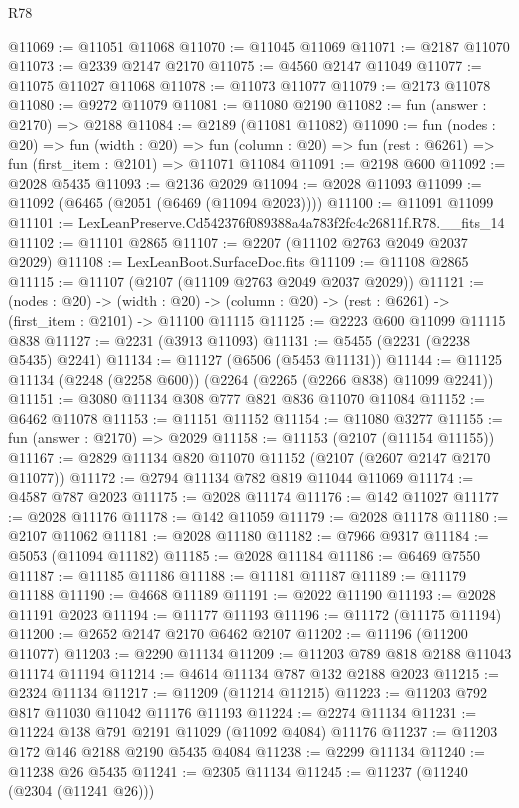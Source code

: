 \begin{lexlean}{R78}
\begin{coremodule}
@11069 := @11051 @11068
@11070 := @11045 @11069
@11071 := @2187 @11070
@11073 := @2339 @2147 @2170
@11075 := @4560 @2147 @11049
@11077 := @11075 @11027 @11068
@11078 := @11073 @11077
@11079 := @2173 @11078
@11080 := @9272 @11079
@11081 := @11080 @2190
@11082 := fun (answer : @2170) => @2188
@11084 := @2189 (@11081 @11082)
@11090 := fun (nodes : @20) =>
  fun (width : @20) =>
  fun (column : @20) => fun (rest : @6261) => fun (first_item : @2101) => @11071 @11084
@11091 := @2198 @600
@11092 := @2028 @5435
@11093 := @2136 @2029
@11094 := @2028 @11093
@11099 := @11092 (@6465 (@2051 (@6469 (@11094 @2023))))
@11100 := @11091 @11099
@11101 := LexLeanPreserve.Cd542376f089388a4a783f2fc4c26811f.R78.__fits_14
@11102 := @11101 @2865
@11107 := @2207 (@11102 @2763 @2049 @2037 @2029)
@11108 := LexLeanBoot.SurfaceDoc.fits
@11109 := @11108 @2865
@11115 := @11107 (@2107 (@11109 @2763 @2049 @2037 @2029))
@11121 := (nodes : @20) ->
  (width : @20) -> (column : @20) -> (rest : @6261) -> (first_item : @2101) -> @11100 @11115
@11125 := @2223 @600 @11099 @11115 @838
@11127 := @2231 (@3913 @11093)
@11131 := @5455 (@2231 (@2238 @5435) @2241)
@11134 := @11127 (@6506 (@5453 @11131))
@11144 := @11125 @11134 (@2248 (@2258 @600)) (@2264 (@2265 (@2266 @838) @11099 @2241))
@11151 := @3080 @11134 @308 @777 @821 @836 @11070 @11084
@11152 := @6462 @11078
@11153 := @11151 @11152
@11154 := @11080 @3277
@11155 := fun (answer : @2170) => @2029
@11158 := @11153 (@2107 (@11154 @11155))
@11167 := @2829 @11134 @820 @11070 @11152 (@2107 (@2607 @2147 @2170 @11077))
@11172 := @2794 @11134 @782 @819 @11044 @11069
@11174 := @4587 @787 @2023
@11175 := @2028 @11174
@11176 := @142 @11027
@11177 := @2028 @11176
@11178 := @142 @11059
@11179 := @2028 @11178
@11180 := @2107 @11062
@11181 := @2028 @11180
@11182 := @7966 @9317
@11184 := @5053 (@11094 @11182)
@11185 := @2028 @11184
@11186 := @6469 @7550
@11187 := @11185 @11186
@11188 := @11181 @11187
@11189 := @11179 @11188
@11190 := @4668 @11189
@11191 := @2022 @11190
@11193 := @2028 @11191 @2023
@11194 := @11177 @11193
@11196 := @11172 (@11175 @11194)
@11200 := @2652 @2147 @2170 @6462 @2107
@11202 := @11196 (@11200 @11077)
@11203 := @2290 @11134
@11209 := @11203 @789 @818 @2188 @11043 @11174 @11194
@11214 := @4614 @11134 @787 @132 @2188 @2023
@11215 := @2324 @11134
@11217 := @11209 (@11214 @11215)
@11223 := @11203 @792 @817 @11030 @11042 @11176 @11193
@11224 := @2274 @11134
@11231 := @11224 @138 @791 @2191 @11029 (@11092 @4084) @11176
@11237 := @11203 @172 @146 @2188 @2190 @5435 @4084
@11238 := @2299 @11134
@11240 := @11238 @26 @5435
@11241 := @2305 @11134
@11245 := @11237 (@11240 (@2304 (@11241 @26)))

\end{coremodule}
\end{lexlean}
